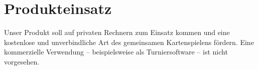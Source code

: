 \chapter{Produkteinsatz}

	Unser Produkt soll auf privaten Rechnern zum Einsatz kommen und eine kostenlose und unverbindliche Art des gemeinsamen Kartenspielens fördern. Eine kommerzielle Verwendung -- beispielsweise als Turniersoftware -- ist nicht vorgesehen.
